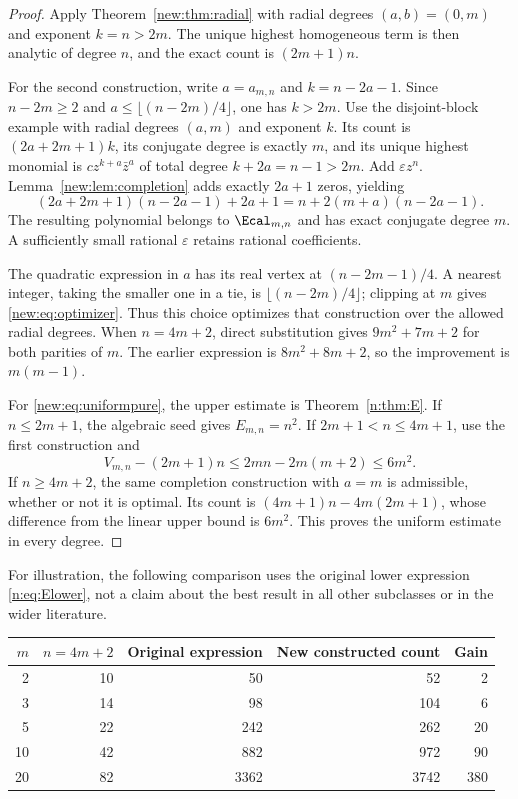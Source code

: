 \documentclass[UTF8,11pt]{ctexart}
\theoremstyle{definition}
\numberwithin{equation}{section}
\begin{document}
\begin{proof}
Apply Theorem~\ref{new:thm:radial} with radial degrees $(a,b)=(0,m)$
and exponent $k=n>2m$. The unique highest homogeneous term is then
analytic of degree $n$, and the exact count is $(2m+1)n$.

For the second construction, write $a=a_{m,n}$ and $k=n-2a-1$.
Since $n-2m\ge2$ and $a\le\lfloor(n-2m)/4\rfloor$, one has $k>2m$.
Use the disjoint-block example with radial degrees $(a,m)$ and exponent
$k$. Its count is $(2a+2m+1)k$, its conjugate degree is exactly $m$,
and its unique highest monomial is $cz^{k+a}\bar z^a$ of total degree
$k+2a=n-1>2m$. Add $\varepsilon z^n$.
Lemma~\ref{new:lem:completion} adds exactly $2a+1$ zeros, yielding
\[
 (2a+2m+1)(n-2a-1)+2a+1
 =n+2(m+a)(n-2a-1).
\]
The resulting polynomial belongs to $\Ecal_{m,n}$ and has exact
conjugate degree $m$. A sufficiently small rational $\varepsilon$
retains rational coefficients.

The quadratic expression in $a$ has its real vertex at
$(n-2m-1)/4$. A nearest integer, taking the smaller one in a tie,
is $\lfloor(n-2m)/4\rfloor$; clipping at $m$ gives
\eqref{new:eq:optimizer}. Thus this choice optimizes that construction
over the allowed radial degrees. When $n=4m+2$, direct substitution
gives $9m^2+7m+2$ for both parities of $m$. The earlier expression is
$8m^2+8m+2$, so the improvement is $m(m-1)$.

For \eqref{new:eq:uniformpure}, the upper estimate is
Theorem~\ref{n:thm:E}. If $n\le2m+1$, the algebraic seed gives
$E_{m,n}=n^2$. If $2m+1<n\le4m+1$, use the first construction and
\[
 V_{m,n}-(2m+1)n\le2mn-2m(m+2)\le6m^2.
\]
If $n\ge4m+2$, the same completion construction with $a=m$ is
admissible, whether or not it is optimal. Its count is
$(4m+1)n-4m(2m+1)$, whose difference from the linear upper bound
is $6m^2$. This proves the uniform estimate in every degree.
\end{proof}

For illustration, the following comparison uses the original lower
expression \eqref{n:eq:Elower}, not a claim about the best result in all
other subclasses or in the wider literature.
\begin{center}
\begin{tabular}{@{}rrrrr@{}}
\toprule
$m$ & $n=4m+2$ & Original expression & New constructed count & Gain\\
\midrule
2 & 10 & 50 & 52 & 2\\
3 & 14 & 98 & 104 & 6\\
5 & 22 & 242 & 262 & 20\\
10 & 42 & 882 & 972 & 90\\
20 & 82 & 3362 & 3742 & 380\\
\bottomrule
\end{tabular}
\end{center}
\end{document}
